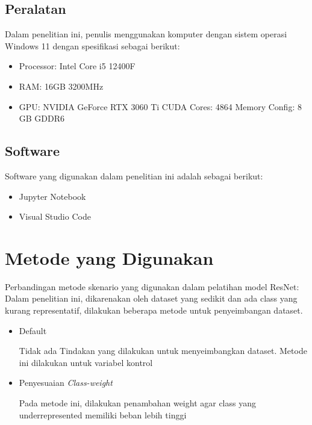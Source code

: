 \subsection{Peralatan}
\label{sec:312}

Dalam penelitian ini, penulis menggunakan komputer dengan sistem operasi Windows 11 dengan spesifikasi sebagai berikut:

\begin{itemize}
	\item Processor: Intel Core i5 12400F
	\item RAM: 16GB 3200MHz
	\item GPU: NVIDIA GeForce RTX 3060 Ti
	\subitem CUDA Cores: 4864
	\subitem Memory Config: 8 GB GDDR6
\end{itemize}

\subsection{Software}
\label{sec:313}

Software yang digunakan dalam penelitian ini adalah sebagai berikut:
\begin{itemize}
	\item Jupyter Notebook
	\item Visual Studio Code
\end{itemize}

\section{Metode yang Digunakan}
\label{sec:32}

Perbandingan metode skenario yang digunakan dalam pelatihan model ResNet:
Dalam penelitian ini, dikarenakan oleh dataset yang sedikit dan ada class yang kurang representatif, dilakukan beberapa metode untuk penyeimbangan dataset.
\begin{itemize}
	\item Default
	
	Tidak ada Tindakan yang dilakukan untuk menyeimbangkan dataset. Metode ini dilakukan untuk variabel kontrol
	\item Penyesuaian \emph{Class-weight}
	
	Pada metode ini, dilakukan penambahan weight agar class yang underrepresented memiliki beban lebih tinggi
\end{itemize}

